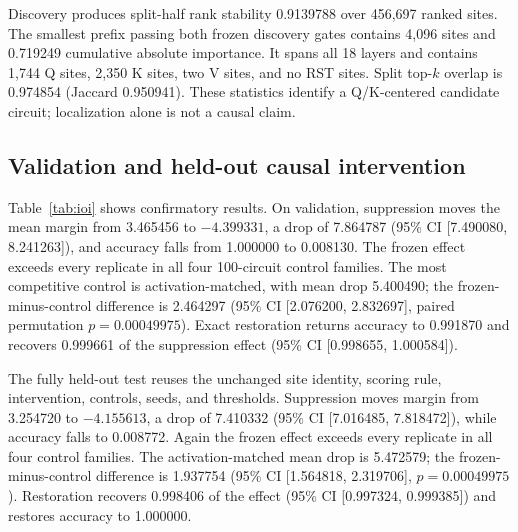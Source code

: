 \documentclass{article}
\begin{document}
Discovery produces split-half rank stability 0.9139788 over 456,697 ranked
sites. The smallest prefix passing both frozen discovery gates contains 4,096
sites and 0.719249 cumulative absolute importance. It spans all 18 layers and
contains 1,744 Q sites, 2,350 K sites, two V sites, and no RST sites. Split
top-\(k\) overlap is 0.974854 (Jaccard 0.950941). These statistics identify a
Q/K-centered candidate circuit; localization alone is not a causal claim.

\subsection{Validation and held-out causal intervention}
\label{sec:causal}

Table~\ref{tab:ioi} shows confirmatory results. On validation, suppression
moves the mean margin from 3.465456 to \(-4.399331\), a drop of 7.864787
(95\% CI [7.490080, 8.241263]), and accuracy falls from 1.000000 to 0.008130.
The frozen effect exceeds every replicate in all four 100-circuit control
families. The most competitive control is activation-matched, with mean drop
5.400490; the frozen-minus-control difference is 2.464297 (95\% CI
[2.076200, 2.832697], paired permutation \(p=0.00049975\)). Exact restoration
returns accuracy to 0.991870 and recovers 0.999661 of the suppression effect
(95\% CI [0.998655, 1.000584]).

\begin{table}[t]
\centering
\caption{Frozen IOI circuit results. Accuracy arrows show intact to
suppressed. Recovery is the fraction of the suppression effect recovered by
exact same-example numerator restoration.}
\label{tab:ioi}
\small
{}
\end{table}

The fully held-out test reuses the unchanged site identity, scoring rule,
intervention, controls, seeds, and thresholds. Suppression moves margin from
3.254720 to \(-4.155613\), a drop of 7.410332 (95\% CI
[7.016485, 7.818472]), while accuracy falls to 0.008772. Again the frozen
effect exceeds every replicate in all four control families. The
activation-matched mean drop is 5.472579; the frozen-minus-control difference
is 1.937754 (95\% CI [1.564818, 2.319706], \(p=0.00049975\)). Restoration
recovers 0.998406 of the effect (95\% CI [0.997324, 0.999385]) and restores
accuracy to 1.000000.
\end{document}

